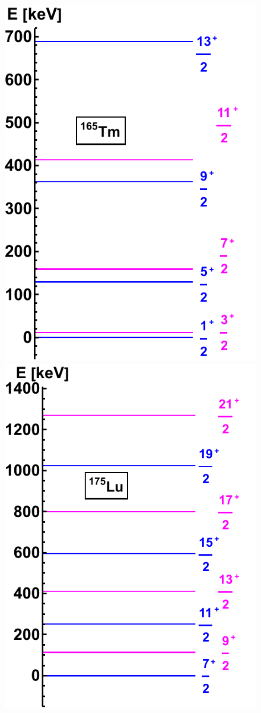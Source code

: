 \begin{figure}
    \centering
    \includegraphics[scale=0.7]{Chapters/Figures/Tm165-Rotational-Bands.pdf}
    \includegraphics[scale=0.7]{Chapters/Figures/Lu175-Rotational-Bands.pdf}

\end{figure}
